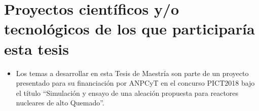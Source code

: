 \section*{ Proyectos científicos y/o tecnológicos de los que participaría esta tesis  }

\begin{itemize}

\item Los temas a desarrollar en esta Tesis de Maestría son parte de un proyecto
    presentado para su financiación
por ANPCyT en el concurso PICT2018 bajo el título ``Simulación y ensayo de una
aleación propuesta para reactores nucleares de alto
Quemado''.

\end{itemize}








